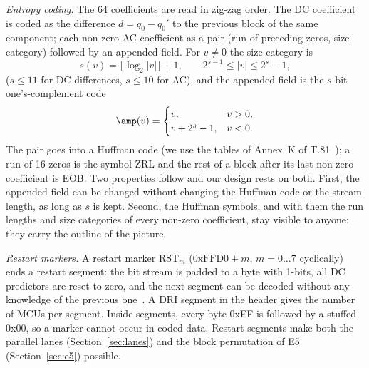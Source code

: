 \textit{Entropy coding.} The 64 coefficients are read in zig-zag order. The DC coefficient is coded as the difference $d = q_0 - q_0'$ to the previous block of the same component; each non-zero AC coefficient as a pair (run of preceding zeros, size category) followed by an appended field. For $v \ne 0$ the size category is
\begin{equation}
s(v) = \lfloor \log_2 |v| \rfloor + 1, \qquad 2^{s-1} \le |v| \le 2^s - 1,
\label{eq:size}
\end{equation}
($s \le 11$ for DC differences, $s \le 10$ for AC), and the appended field is the $s$-bit one's-complement code
\begin{equation}
\amp(v) = \begin{cases} v, & v > 0,\\ v + 2^s - 1, & v < 0. \end{cases}
\label{eq:amp}
\end{equation}
The pair goes into a Huffman code (we use the tables of Annex~K of T.81~\cite{t81,wallace1992}); a run of 16 zeros is the symbol ZRL and the rest of a block after its last non-zero coefficient is EOB. Two properties follow and our design rests on both. First, the appended field can be changed without changing the Huffman code or the stream length, as long as $s$ is kept. Second, the Huffman symbols, and with them the run lengths and size categories of every non-zero coefficient, stay visible to anyone: they carry the outline of the picture.

\textit{Restart markers.} A restart marker RST$_m$ ($\mathrm{0xFFD0} + m$, $m = 0 \ldots 7$ cyclically) ends a restart segment: the bit stream is padded to a byte with 1-bits, all DC predictors are reset to zero, and the next segment can be decoded without any knowledge of the previous one~\cite{t81}. A DRI segment in the header gives the number of MCUs per segment. Inside segments, every byte 0xFF is followed by a stuffed 0x00, so a marker cannot occur in coded data. Restart segments make both the parallel lanes (Section~\ref{sec:lanes}) and the block permutation of E5 (Section~\ref{sec:e5}) possible.

